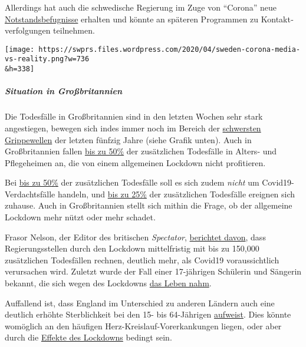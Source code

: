 Allerdings hat auch die schwedische Regierung im Zuge von ``Corona''
neue
\href{https://www.tagesschau.de/faktenfinder/ausland/corona-kursaenderung-schweden-103.html}{Notstands­befug­nisse}
erhalten und könnte an späteren Programmen zu Kontakt­verfolgungen
teilnehmen.

\texttt{[image: https://swprs.files.wordpress.com/2020/04/sweden-corona-media-vs-reality.png?w=736\\\&h=338]}

\hypertarget{situation-in-grouxdfbritannien}{%
\subparagraph{\texorpdfstring{\textbf{Situation in
Großbritannien}}{Situation in Großbritannien}}\label{situation-in-grouxdfbritannien}}

Die Todesfälle in Großbritannien sind in den letzten Wochen sehr stark
angestiegen, bewegen sich indes immer noch im Bereich der
\href{http://inproportion2.talkigy.com/}{schwersten Grippewellen} der
letzten fünfzig Jahre (siehe Grafik unten). Auch in Großbritannien
fallen
\href{https://ltccovid.org/2020/04/12/mortality-associated-with-covid-19-outbreaks-in-care-homes-early-international-evidence/}{bis
zu 50\%} der zusätzlichen Todesfälle in Alters- und Pflegeheimen an, die
von einem allgemeinen Lockdown nicht profitieren.

Bei
\href{https://www.thetimes.co.uk/edition/news/coronavirus-record-weekly-death-toll-as-fearful-patients-avoid-hospitals-bm73s2tw3}{bis
zu 50\%} der zusätzlichen Todesfälle soll es sich zudem \emph{nicht} um
Covid19-Verdachtsfälle handeln, und
\href{https://www.ft.com/content/67e6a4ee-3d05-43bc-ba03-e239799fa6ab}{bis
zu 25\%} der zusätzlichen Todesfälle ereignen sich zuhause. Auch in
Großbritannien stellt sich mithin die Frage, ob der allgemeine Lockdown
mehr nützt oder mehr schadet.

Frasor Nelson, der Editor des britischen \emph{Spectator},
\href{https://www.telegraph.co.uk/politics/2020/04/09/boris-worried-lockdown-has-gone-far-can-end/}{berichtet
davon}, dass Regierungs­stellen durch den Lockdown mittelfristig mit bis
zu 150,000 zusätzlichen Todesfällen rechnen, deutlich mehr, als Covid19
voraussichtlich verursachen wird. Zuletzt wurde der Fall einer
17-jährigen Schülerin und Sängerin bekannt, die sich wegen des Lockdowns
\href{https://sports.yahoo.com/coronavirus-bethany-palmer-teenager-death-suicide-152707750.html}{das
Leben nahm}.

Auffallend ist, dass England im Unterschied zu anderen Ländern auch eine
deutlich erhöhte Sterblichkeit bei den 15- bis 64-Jährigen
\href{https://www.euromomo.eu/}{aufweist}. Dies könnte womöglich an den
häufigen Herz-Kreislauf-Vorerkankungen liegen, oder aber durch die
\href{https://www.telegraph.co.uk/global-health/science-and-disease/two-new-waves-deaths-break-nhs-new-analysis-warns/}{Effekte
des Lockdowns} bedingt sein.

